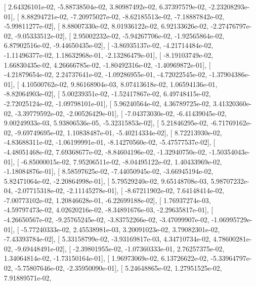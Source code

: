 \documentclass{article}
\begin{document}
       [  2.64326101e-02,  -5.88738504e-02,   3.80987492e-02,
          6.37397579e-02,  -2.23208293e-01],
       [  8.88294721e-02,  -7.20975027e-02,  -8.62185513e-02,
         -7.18887842e-02,  -5.99811277e-02],
       [  8.88007330e-02,   8.01936122e-02,   6.92133626e-02,
         -2.27476797e-02,  -9.05333512e-02],
       [  2.95002232e-02,  -5.94267706e-02,  -1.92565864e-02,
          6.87902516e-02,  -9.44650435e-02],
       [ -3.86935137e-02,  -4.21714484e-02,  -1.11496377e-02,
          1.18632968e-01,  -2.13286479e-01],
       [ -8.19103749e-02,   1.66830435e-02,   4.26666785e-02,
         -1.80492316e-02,  -1.40969872e-01],
       [ -4.21879654e-02,   2.24737641e-02,  -1.09286955e-01,
         -4.72022545e-02,  -1.37904386e-01],
       [  4.10500762e-02,   9.86168904e-03,   8.07413618e-02,
          1.06594136e-01,  -8.82064903e-02],
       [  5.00239351e-02,  -1.52417867e-02,   6.49748415e-02,
         -2.72025124e-02,  -1.09798101e-01],
       [  5.96240564e-02,   4.36789725e-02,   3.41320360e-02,
         -3.39779592e-02,  -2.00526429e-01],
       [ -7.04373030e-02,  -6.41439045e-02,   9.00249933e-03,
          5.93806536e-05,  -5.32315853e-02],
       [  5.21846295e-02,  -6.71769162e-02,  -9.69749695e-02,
          1.10838487e-01,  -5.40214334e-02],
       [  8.72213930e-02,  -4.83688311e-02,  -1.06199991e-01,
         -8.14270560e-02,  -5.47577537e-02],
       [ -4.48051468e-02,   7.69368677e-02,  -8.84604196e-02,
         -1.32940750e-02,  -1.50354043e-01],
       [ -6.85000015e-02,   7.95206511e-02,  -8.04495122e-02,
          1.40433969e-02,  -1.18084876e-01],
       [  8.58597625e-02,  -7.44050945e-02,  -3.66945194e-02,
          5.82471064e-02,  -2.20864998e-01],
       [  5.79529240e-02,   9.65148708e-03,   5.98707232e-04,
         -2.07715318e-02,  -2.11145278e-01],
       [ -8.67211902e-02,   7.64148414e-02,  -7.00773102e-02,
          1.20846628e-01,  -6.22699188e-02],
       [  1.76937274e-03,  -4.59797473e-02,   4.02620216e-02,
         -8.34891676e-03,  -2.29635817e-01],
       [ -4.26650567e-02,  -9.25765245e-02,  -3.83752266e-02,
         -3.47099907e-02,  -1.06995729e-01],
       [ -5.77240333e-02,   2.45538981e-03,   3.20091023e-02,
          3.79082301e-02,  -7.43393784e-02],
       [  5.33158799e-02,  -3.93169817e-03,   4.34710734e-02,
          4.78600281e-02,  -9.69448491e-02],
       [ -2.39801955e-02,  -1.07360333e-01,   2.76257375e-02,
          1.34064814e-02,  -1.73150164e-01],
       [  1.96973069e-02,   6.13726622e-02,  -5.33964797e-02,
         -5.75807646e-02,  -2.35950090e-01],
       [  5.24648865e-02,   1.27951525e-02,   7.91889571e-02,
\end{document}
